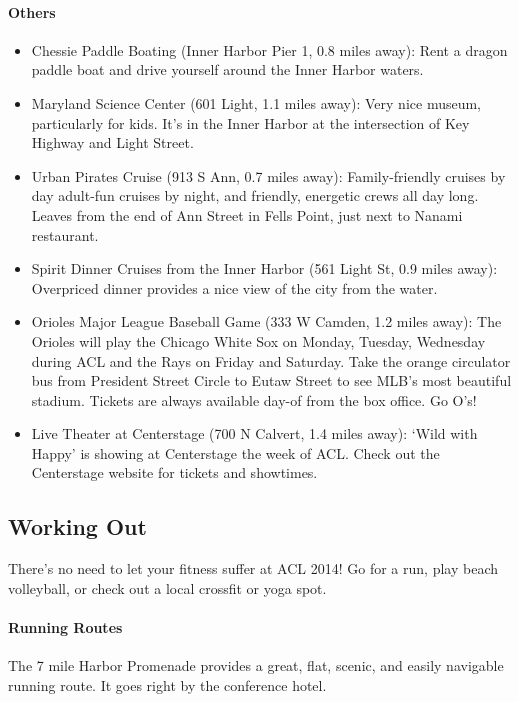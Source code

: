 \paragraph*{Others}
\begin{itemize}
\item{Chessie Paddle Boating (Inner Harbor Pier 1, 0.8 miles away): Rent a dragon paddle boat and drive yourself around the Inner Harbor waters.}
\item{Maryland Science Center (601 Light, 1.1 miles away): Very nice museum, particularly for kids. It's in the Inner Harbor at the intersection of Key Highway and Light Street.}
\item{Urban Pirates Cruise (913 S Ann, 0.7 miles away): Family-friendly cruises by day adult-fun cruises by night, and friendly, energetic crews all day long. Leaves from the end of Ann Street in Fells Point, just next to Nanami restaurant.}
\item{Spirit Dinner Cruises from the Inner Harbor (561 Light St, 0.9 miles away): Overpriced dinner provides a nice view of the city from the water.}
\item{Orioles Major League Baseball Game (333 W Camden, 1.2 miles away): The Orioles will play the Chicago White Sox on Monday, Tuesday, Wednesday during ACL and the Rays on Friday and Saturday. Take the orange circulator bus from President Street Circle to Eutaw Street to see MLB's most beautiful stadium. Tickets are always available day-of from the box office. Go O's!}
\item{Live Theater at Centerstage (700 N Calvert, 1.4 miles away): ‘Wild with Happy' is showing at Centerstage the week of ACL. Check out the Centerstage website for tickets and showtimes.}
\end{itemize}

\subsection*{Working Out}
There's no need to let your fitness suffer at ACL 2014! Go for a run, play beach volleyball, or check out a local crossfit or yoga spot. 

\paragraph*{Running Routes}
The 7 mile Harbor Promenade provides a great, flat, scenic, and easily navigable running route. It goes right by the conference hotel. 

